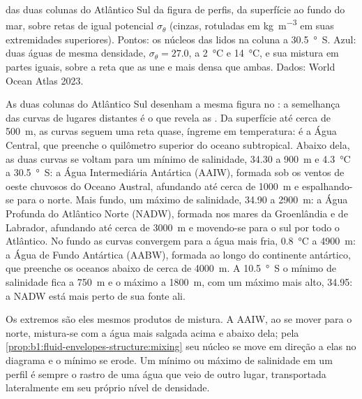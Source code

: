 \begin{omfigure}
{\small {} das duas colunas do Atlântico Sul da figura de perfis, da superfície ao fundo
do mar, sobre retas de igual  potencial $\sigma_\theta$ (cinzas, rotuladas em
\si{kg.m^{-3}} em suas extremidades superiores). Pontos: os núcleos das  lidos na
coluna a \qty{30.5}{\degree S}. Azul: duas águas de mesma densidade, $\sigma_\theta = 27.0$, a
\qty{2}{\celsius} e \qty{14}{\celsius}, e sua mistura em partes iguais, sobre a reta que as une e
mais densa que ambas. Dados: World Ocean Atlas 2023.}
\label{fig:b1:fluid-envelopes-structure:ts}
\end{omfigure}

As duas colunas do Atlântico Sul desenham a mesma figura no : a semelhança das curvas
de lugares distantes é o que revela as . Da superfície até cerca de \qty{500}{m}, as
curvas seguem uma reta quase, íngreme em temperatura: é a Água Central, que preenche o quilômetro
superior do oceano subtropical. Abaixo dela, as duas curvas se voltam para um mínimo de salinidade,
\num{34.30} a \qty{900}{m} e \qty{4.3}{\celsius} a \qty{30.5}{\degree S}: a Água Intermediária
Antártica (AAIW), formada sob os ventos de oeste chuvosos do Oceano Austral, afundando até cerca de
\qty{1000}{m} e espalhando-se para o norte. Mais fundo, um máximo de salinidade, \num{34.90} a
\qty{2900}{m}: a Água Profunda do Atlântico Norte (NADW), formada nos mares da Groenlândia e de
Labrador, afundando até cerca de \qty{3000}{m} e movendo-se para o sul por todo o Atlântico. No
fundo as curvas convergem para a água mais fria, \qty{0.8}{\celsius} a \qty{4900}{m}: a Água de
Fundo Antártica (AABW), formada ao longo do continente antártico, que preenche os oceanos abaixo de
cerca de \qty{4000}{m}. A \qty{10.5}{\degree S} o mínimo de salinidade fica a \qty{750}{m} e o
máximo a \qty{1800}{m}, com um máximo mais alto, \num{34.95}: a NADW está mais perto de sua fonte ali.

Os extremos são eles mesmos produtos de mistura. A AAIW, ao se mover para o norte, mistura-se com a
água mais salgada acima e abaixo dela; pela \cref{prop:b1:fluid-envelopes-structure:mixing} seu
núcleo se move em direção a elas no diagrama e o mínimo se erode. Um mínimo ou máximo de salinidade
em um perfil é sempre o rastro de uma água que veio de outro lugar, transportada lateralmente em
seu próprio nível de densidade.

